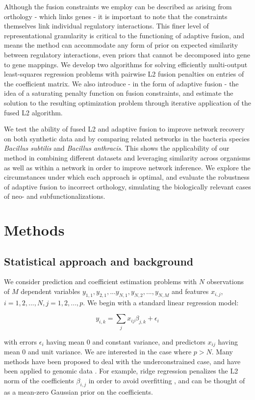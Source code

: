 \documentclass[11pt]{article}
\begin{document}
Although the fusion constraints we employ can be described as arising from orthology - which links genes - it is important to note that the constraints themselves link individual regulatory interactions. This finer level of representational granularity is critical to the functioning of adaptive fusion, and means the method can accommodate any form of prior on expected similarity between regulatory interactions, even priors that cannot be decomposed into gene to gene mappings. We develop two algorithms for solving efficiently multi-output least-squares regression problems with pairwise L2 fusion penalties on entries of the coefficient matrix. We also introduce - in the form of adaptive fusion - the idea of a saturating penalty function on fusion constraints, and estimate the solution to the resulting optimization problem through iterative application of the fused L2 algorithm.

We test the ability of fused L2 and adaptive fusion to improve network recovery on both synthetic data and by comparing related networks in the bacteria species \textit{Bacillus subtilis} and \textit{Bacillus anthracis}. This shows the applicability of our method in combining different datasets and leveraging similarity across organisms as well as within a network in order to improve network inference. We explore the circumstances under which each approach is optimal, and evaluate the robustness of adaptive fusion to incorrect orthology, simulating the biologically relevant cases of neo- and subfunctionalizations. 


\section{Methods}

\subsection{Statistical approach and background}
We consider prediction and coefficient estimation problems with $N$ observations of $M$ dependent variables $y_{1,1}, y_{2,1}, ...y_{N,1}, y_{N,2},..., y_{N, M}$ and features $x_{i,j}$, $i=1,2,...,N, j=1,2,...,p$. We begin with a standard linear regression model:

\begin{equation}
y_{i,k} = \displaystyle\sum_{j}x_{ij}\beta_{j,k} + \epsilon_i
\end{equation}

with errors $\epsilon_i$ having mean 0 and constant variance, and predictors $x_{ij}$ having mean 0 and unit variance. We are interested in the case where $p > N$. Many methods have been proposed to deal with the underconstrained case, and have been applied to genomic data \cite{waldron_optimized_2011, li_network-constrained_2008}. For example, ridge regression penalizes the L2 norm of the coefficients $\beta_{i,j}$ in order to avoid overfitting \cite{hoerl_ridge_1970}, and can be thought of as a mean-zero Gaussian prior on the coefficients. 
\end{document}
